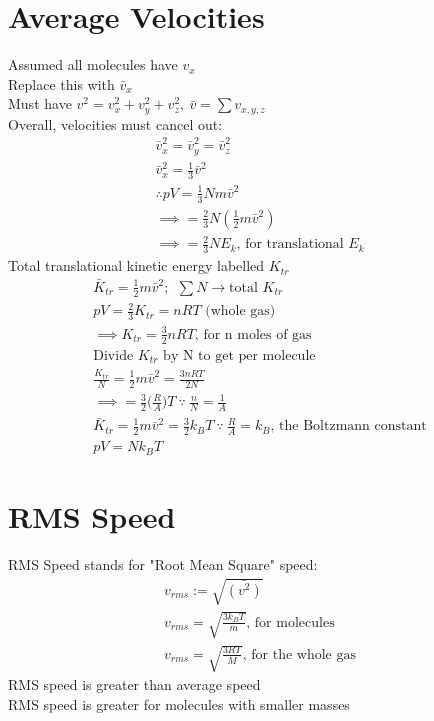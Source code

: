 \documentclass[a4paper, 11pt, fleqn, normalem]{report}
\begin{document}
\section*{Average Velocities}
Assumed all molecules have $v_{x}$ \\
Replace this with $\bar{v}_{x}$ \\
Must have $v^{2} = v_{x}^{2} + v_{y}^{2} + v_{z}^{2},~ \bar{v} = \sum v_{x,y,z}$ \\
Overall, velocities must cancel out:
\begin{gather*}
	\bar{v}_{x}^{2} = \bar{v}_{y}^{2} = \bar{v}_{z}^{2} \\
	\bar{v}_{x}^{2} = \frac{1}{3}\bar{v}^{2} \\
	\therefore pV = \frac{1}{3}Nm\bar{v}^{2} \\
	\implies = \frac{2}{3}N(\frac{1}{2}m\bar{v}^{2}) \\
	\implies = \frac{2}{3}NE_{k} \text{, for translational }E_{k}
\end{gather*}
Total translational kinetic energy labelled $K_{tr}$
\begin{gather*}
	\bar{K}_{tr} = \frac{1}{2}m\bar{v}^{2};~~ \sum N \rightarrow \text{total }K_{tr} \\
	pV = \frac{2}{3}K_{tr} = nRT \text{ (whole gas)} \\
	\implies K_{tr} = \frac{3}{2}nRT\text{, for n moles of gas} \\
	\text{Divide }K_{tr}\text{ by N to get per molecule} \\
	\frac{K_{tr}}{N} = \frac{1}{2}m\bar{v}^{2} = \frac{3nRT}{2N} \\
	\implies = \frac{3}{2}\Big(\frac{R}{A}\Big)T ~\because~ \frac{n}{N} = \frac{1}{A} \\
	\bar{K}_{tr} = \frac{1}{2}m\bar{v}^{2} = \frac{3}{2}k_{B}T ~\because~ \frac{R}{A} = k_{B}\text{, the Boltzmann constant} \\
	pV = Nk_{B}T
\end{gather*}
\section*{RMS Speed}
RMS Speed stands for "Root Mean Square" speed:
\begin{gather*}
	v_{rms} := \sqrt{\bar{(v^{2})}} \\
	v_{rms} = \sqrt{\frac{3k_{B}T}{m}}\text{, for molecules} \\
	v_{rms} = \sqrt{\frac{3RT}{M}}\text{, for the whole gas}
\end{gather*}
RMS speed is greater than average speed \\
RMS speed is greater for molecules with smaller masses
\end{document}
